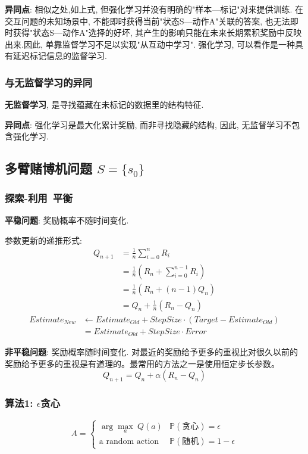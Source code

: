 \documentclass{article}
\newcommand{\env}[2]{\begin{#1}#2\end{#1}}
\begin{document}
            \textbf{异同点}: 相似之处,如上式, 但强化学习并没有明确的"样本---标记"对来提供训练. 在交互问题的未知场景中, 不能即时获得当前"状态S---动作A"关联的答案, 也无法即时获得"状态S---动作A"选择的好坏, 其产生的影响只能在未来长期累积奖励中反映出来.因此, 单靠监督学习不足以实现"从互动中学习". 强化学习, 可以看作是一种具有延迟标记信息的监督学习.
            
            
        
        \subsubsection{与无监督学习的异同}
            \textbf{无监督学习}, 是寻找蕴藏在未标记的数据里的结构特征.

            \textbf{异同点}: 强化学习是最大化累计奖励, 而非寻找隐藏的结构, 因此, 无监督学习不包含强化学习.

        
        
    \subsection{多臂赌博机问题 $S = \{s_0\}$}
        \subsubsection{探索-利用\ 平衡}
        
        \textbf{平稳问题}: 奖励概率不随时间变化.
        
        参数更新的递推形式:
        \env{align*}{
            Q_{n+1} 
            &= \frac{1}{n} \sum_{i = 0}^n R_i\\
            &= \frac{1}{n} (R_n + \sum_{i = 0}^{n-1} R_i)\\
            &= \frac{1}{n} (R_n + (n-1) Q_n)\\
            &= Q_n + \frac{1}{n} (R_n - Q_n)
        }
        \env{align*}{
            Estimate_{New} 
            &\gets Estimate_{Old} + StepSize\cdot (Target - Estimate_{Old})\\
            &= Estimate_{Old} + StepSize\cdot Error
        }
        
        \textbf{非平稳问题}: 奖励概率随时间变化. 对最近的奖励给予更多的重视比对很久以前的奖励给予更多的重视是有道理的。最常用的方法之一是使用恒定步长参数。
            $$Q_{n+1} = Q_n + \alpha (R_n - Q_n)$$
            
        \subsubsection{算法1: $\epsilon$贪心}
            \begin{displaymath} A = \left\{ \begin{array}{ll}
                \arg\max_a\ Q(a) & \mathbb{P}(\text{贪心}) = \epsilon\\
                \text{a random action} & \mathbb{P}(\text{随机}) = 1 - \epsilon
            \end{array} \right. \end{displaymath}
            
\end{document}
